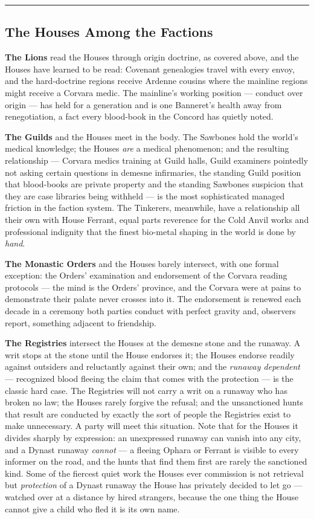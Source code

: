 \medskip\hrule\medskip

\subsection{The Houses Among the Factions}

\textbf{The Lions} read the Houses through origin doctrine, as covered above, and the Houses have learned to be read: Covenant genealogies travel with every envoy, and the hard-doctrine regions receive Ardenne cousins where the mainline regions might receive a Corvara medic. The mainline's working position --- conduct over origin --- has held for a generation and is one Banneret's health away from renegotiation, a fact every blood-book in the Concord has quietly noted.

\textbf{The Guilds} and the Houses meet in the body. The Sawbones hold the world's medical knowledge; the Houses \textit{are} a medical phenomenon; and the resulting relationship --- Corvara medics training at Guild halls, Guild examiners pointedly not asking certain questions in demesne infirmaries, the standing Guild position that blood-books are private property and the standing Sawbones suspicion that they are case libraries being withheld --- is the most sophisticated managed friction in the faction system. The Tinkerers, meanwhile, have a relationship all their own with House Ferrant, equal parts reverence for the Cold Anvil works and professional indignity that the finest bio-metal shaping in the world is done by \textit{hand}.

\textbf{The Monastic Orders} and the Houses barely intersect, with one formal exception: the Orders' examination and endorsement of the Corvara reading protocols --- the mind is the Orders' province, and the Corvara were at pains to demonstrate their palate never crosses into it. The endorsement is renewed each decade in a ceremony both parties conduct with perfect gravity and, observers report, something adjacent to friendship.

\textbf{The Registries} intersect the Houses at the demesne stone and the runaway. A writ stops at the stone until the House endorses it; the Houses endorse readily against outsiders and reluctantly against their own; and the \textit{runaway dependent} --- recognized blood fleeing the claim that comes with the protection --- is the classic hard case. The Registries will not carry a writ on a runaway who has broken no law; the Houses rarely forgive the refusal; and the unsanctioned hunts that result are conducted by exactly the sort of people the Registries exist to make unnecessary. A party will meet this situation. Note that for the Houses it divides sharply by expression: an unexpressed runaway can vanish into any city, and a Dynast runaway \textit{cannot} --- a fleeing Ophara or Ferrant is visible to every informer on the road, and the hunts that find them first are rarely the sanctioned kind. Some of the fiercest quiet work the Houses ever commission is not retrieval but \textit{protection} of a Dynast runaway the House has privately decided to let go --- watched over at a distance by hired strangers, because the one thing the House cannot give a child who fled it is its own name.

